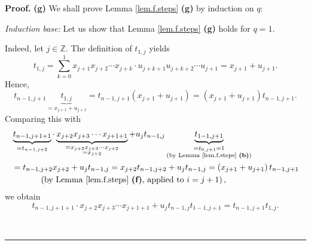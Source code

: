 \documentclass[numbers=enddot,12pt,final,onecolumn,notitlepage]{scrartcl}%
\theoremstyle{definition}
\newenvironment{proof}[1][Proof]{\noindent\textbf{#1.} }{\ \rule{0.5em}{0.5em}}
\let\sumnonlimits\sum
\renewcommand{\sum}{\sumnonlimits\limits}
\newenvironment{vershort}{}{}
\begin{document}
\begin{proof}
\textbf{(g)} We shall prove Lemma \ref{lem.f.steps} \textbf{(g)} by induction
on $q$:

\textit{Induction base:} Let us show that Lemma \ref{lem.f.steps} \textbf{(g)}
holds for $q=1$.

\begin{vershort}
Indeed, let $j\in\mathbb{Z}$. The definition of $t_{1,j}$ yields%
\[
t_{1,j}=\sum_{k=0}^{1}x_{j+1}x_{j+2}\cdots x_{j+k}\cdot u_{j+k+1}%
u_{j+k+2}\cdots u_{j+1}=x_{j+1}+u_{j+1}.
\]
Hence,%
\[
t_{n-1,j+1}\underbrace{t_{1,j}}_{=x_{j+1}+u_{j+1}}=t_{n-1,j+1}\left(
x_{j+1}+u_{j+1}\right)  =\left(  x_{j+1}+u_{j+1}\right)  t_{n-1,j+1}.
\]
Comparing this with%
\begin{align*}
&  \underbrace{t_{n-1,j+1+1}}_{=t_{n-1,j+2}}\cdot\underbrace{x_{j+2}%
x_{j+3}\cdots x_{j+1+1}}_{\substack{=x_{j+2}x_{j+3}\cdots x_{j+2}\\=x_{j+2}%
}}+u_{j}t_{n-1,j}\underbrace{t_{1-1,j+1}}_{\substack{=t_{0,j+1}=1\\\text{(by
Lemma \ref{lem.f.steps} \textbf{(b)})}}}\\
&  =t_{n-1,j+2}x_{j+2}+u_{j}t_{n-1,j}=x_{j+2}t_{n-1,j+2}+u_{j}t_{n-1,j}%
=\left(  x_{j+1}+u_{j+1}\right)  t_{n-1,j+1}\\
&  \ \ \ \ \ \ \ \ \ \ \left(  \text{by Lemma \ref{lem.f.steps} \textbf{(f)},
applied to }i=j+1\right)  ,
\end{align*}
we obtain
\[
t_{n-1,j+1+1}\cdot x_{j+2}x_{j+3}\cdots x_{j+1+1}+u_{j}t_{n-1,j}%
t_{1-1,j+1}=t_{n-1,j+1}t_{1,j}.
\]

\end{vershort}


\end{proof}
\end{document}
